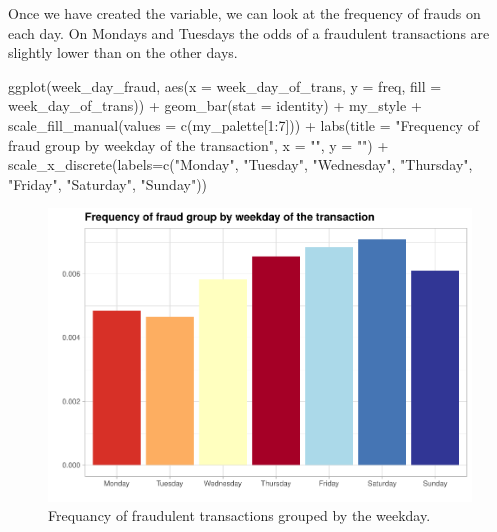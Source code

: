 \documentclass[
]{report}
\newenvironment{Shaded}{\begin{snugshade}}{\end{snugshade}}
\newcommand{\AttributeTok}[1]{\textcolor[rgb]{0.77,0.63,0.00}{#1}}
\newcommand{\DecValTok}[1]{\textcolor[rgb]{0.00,0.00,0.81}{#1}}
\newcommand{\FunctionTok}[1]{\textcolor[rgb]{0.00,0.00,0.00}{#1}}
\newcommand{\NormalTok}[1]{#1}
\newcommand{\SpecialCharTok}[1]{\textcolor[rgb]{0.00,0.00,0.00}{#1}}
\newcommand{\StringTok}[1]{\textcolor[rgb]{0.31,0.60,0.02}{#1}}
\begin{document}
Once we have created the variable, we can look at the frequency of
frauds on each day. On Mondays and Tuesdays the odds of a fraudulent
transactions are slightly lower than on the other days.

\begin{Shaded}
\begin{Highlighting}[]
\FunctionTok{ggplot}\NormalTok{(week\_day\_fraud, }\FunctionTok{aes}\NormalTok{(}\AttributeTok{x =}\NormalTok{ week\_day\_of\_trans, }\AttributeTok{y =}\NormalTok{ freq, }\AttributeTok{fill =}\NormalTok{ week\_day\_of\_trans)) }\SpecialCharTok{+}
  \FunctionTok{geom\_bar}\NormalTok{(}\AttributeTok{stat =} \StringTok{\textquotesingle{}identity\textquotesingle{}}\NormalTok{) }\SpecialCharTok{+}
\NormalTok{  my\_style }\SpecialCharTok{+}
  \FunctionTok{scale\_fill\_manual}\NormalTok{(}\AttributeTok{values =} \FunctionTok{c}\NormalTok{(my\_palette[}\DecValTok{1}\SpecialCharTok{:}\DecValTok{7}\NormalTok{])) }\SpecialCharTok{+}
  \FunctionTok{labs}\NormalTok{(}\AttributeTok{title =} \StringTok{"Frequency of fraud group by weekday of the transaction"}\NormalTok{,}
       \AttributeTok{x =} \StringTok{""}\NormalTok{,}
       \AttributeTok{y =} \StringTok{""}\NormalTok{) }\SpecialCharTok{+}
  \FunctionTok{scale\_x\_discrete}\NormalTok{(}\AttributeTok{labels=}\FunctionTok{c}\NormalTok{(}\StringTok{"Monday"}\NormalTok{, }\StringTok{"Tuesday"}\NormalTok{, }\StringTok{"Wednesday"}\NormalTok{, }\StringTok{"Thursday"}\NormalTok{,}
                            \StringTok{"Friday"}\NormalTok{, }\StringTok{"Saturday"}\NormalTok{, }\StringTok{"Sunday"}\NormalTok{))}
\end{Highlighting}
\end{Shaded}

\begin{figure}
\centering
\includegraphics{credit_card_fraud_detection_files/figure-latex/weekday_plot-1.pdf}
\caption{\label{Fig:weekday_plot}Frequancy of fraudulent transactions
grouped by the weekday.}
\end{figure}
\end{document}
